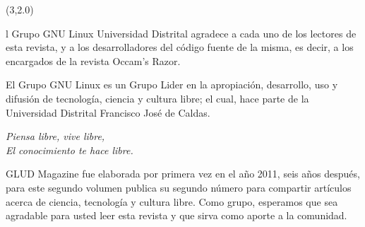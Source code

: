 \begin{textblock}{20}(3,2.0)

\begin{minipage}{.45\linewidth}
\colorbox{introcolor}{
\begin{minipage}{1\linewidth}

{{}{l Grupo GNU Linux Universidad Distrital agradece a cada uno de los lectores de esta revista, y a los desarrolladores del c\'odigo fuente de la misma, es decir, a los encargados de la revista Occam's Razor. 


\bigskip

}
}

\end{minipage}
}

\vspace{8mm}

El Grupo GNU Linux es un Grupo Lider en la apropiación, desarrollo, uso y difusión de tecnología, ciencia y cultura libre; el cual, hace parte de la Universidad Distrital Francisco José de Caldas.

{\large 
	\begin{entradilla}
    \begin{center}
    	{\em Piensa libre, vive libre,\\El conocimiento te hace libre.}
    \end{center}    
    \end{entradilla}
}
\vspace{2mm}
GLUD Magazine fue elaborada por primera vez en el año 2011, seis años después, para este segundo volumen publica su segundo número para compartir artículos acerca de ciencia, tecnología  y cultura libre. Como grupo, esperamos que sea agradable para usted leer esta revista y que sirva como aporte a la comunidad.

\bigskip
\begin{flushright}
{\Large{}}
\end{flushright}
\begin{center}
\end{center}

\end{minipage}

\bigskip

\colorbox{introcolor}{
\begin{minipage}{.45\linewidth}

\bigskip

{\footnotesize{}}
\end{minipage}}
\end{textblock}
